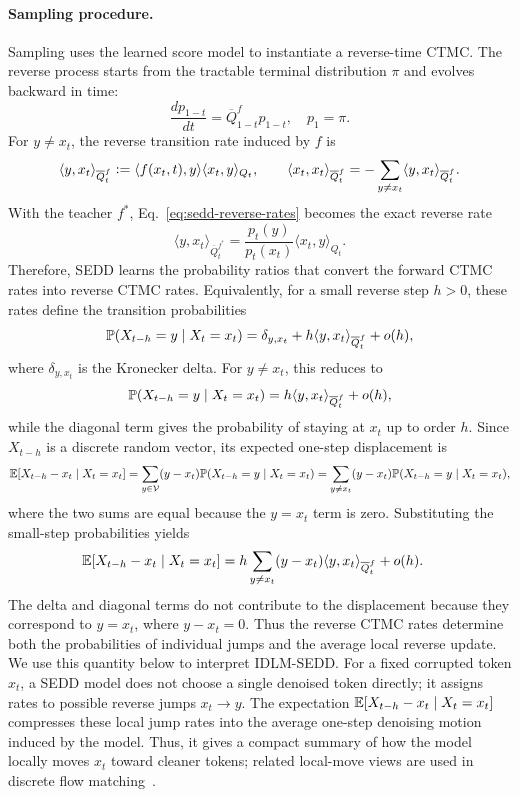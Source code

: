 \paragraph{Sampling procedure.}
Sampling uses the learned score model to instantiate a reverse-time CTMC. The reverse process starts from the tractable terminal distribution $\pi$ and evolves backward in time:
\begin{equation}
    \frac{dp_{1-t}}{dt} = \overline{Q}_{1-t}^{f} p_{1-t}, \quad p_1 = \pi.
    \label{eq:backward diffusion}
\end{equation}
For $y\neq x_t$, the reverse transition rate induced by $f$ is
\begin{equation}
\label{eq:sedd-reverse-rates}
    \langle y,x_t\rangle_{\overline Q_t^f}
    \vcentcolon=
    \langle f(x_t,t),y\rangle
    \langle x_t,y\rangle_{Q_t},
    \qquad
    \langle x_t,x_t\rangle_{\overline Q_t^f}
    =-
    \sum_{y\neq x_t}
    \langle y,x_t\rangle_{\overline Q_t^f}.
\end{equation}
With the teacher $f^*$, Eq.~\eqref{eq:sedd-reverse-rates} becomes the exact reverse rate
\[
    \langle y,x_t\rangle_{\overline Q_t^{f^*}}
    =
    \frac{p_t(y)}{p_t(x_t)}
    \langle x_t,y\rangle_{Q_t}.
\]
Therefore, SEDD learns the probability ratios that convert the forward CTMC rates into reverse CTMC rates. Equivalently, for a small reverse step $h>0$, these rates define the transition probabilities
\[
    \mathbb{P}(X_{t-h}=y\mid X_t=x_t)
    =
    \delta_{y,x_t}
    +
    h\langle y,x_t\rangle_{\overline Q_t^f}
    +
    o(h),
\]
where $\delta_{y,x_t}$ is the Kronecker delta. For $y\neq x_t$, this reduces to
\[
    \mathbb{P}(X_{t-h}=y\mid X_t=x_t)
    =
    h\langle y,x_t\rangle_{\overline Q_t^f}
    +
    o(h),
\]
while the diagonal term gives the probability of staying at $x_t$ up to order $h$. Since $X_{t-h}$ is a discrete random vector, its expected one-step displacement is
\[
    \begin{aligned}
    \mathbb{E}[X_{t-h}-x_t\mid X_t=x_t]
    =
    \sum_{y\in\mathcal{V}}
    (y-x_t)\mathbb{P}(X_{t-h}=y\mid X_t=x_t)
    =
    \sum_{y\neq x_t}
    (y-x_t)\mathbb{P}(X_{t-h}=y\mid X_t=x_t),
    \end{aligned}
\]
where the two sums are equal because the $y=x_t$ term is zero.
Substituting the small-step probabilities yields
\[
\begin{aligned}
    \mathbb{E}[X_{t-h}-x_t\mid X_t=x_t]
    &=
    h\sum_{y\neq x_t}
    (y-x_t)
    \langle y,x_t\rangle_{\overline Q_t^f}
    +
    o(h).
\end{aligned}
\]
The delta and diagonal terms do not contribute to the displacement because they correspond to $y=x_t$, where $y-x_t=0$. Thus the reverse CTMC rates determine both the probabilities of individual jumps and the average local reverse update.
We use this quantity below to interpret IDLM-SEDD. For a fixed corrupted token $x_t$, a SEDD model does not choose a single denoised token directly; it assigns rates to possible reverse jumps $x_t\to y$. The expectation $\mathbb{E}[X_{t-h}-x_t\mid X_t=x_t]$ compresses these local jump rates into the average one-step denoising motion induced by the model. Thus, it gives a compact summary of how the model locally moves $x_t$ toward cleaner tokens; related local-move views are used in discrete flow matching~\citep{gat2024discrete}.

